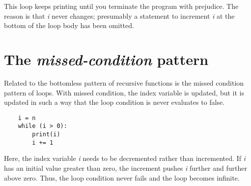 This loop keeps printing until you terminate the program with
prejudice. The reason is that {\it i} never changes; presumably a
statement to increment {\it i} at the bottom of the loop body has
been omitted.

\section{The {\it missed-condition} pattern}

Related to the bottomless pattern of recursive functions
is the missed condition pattern of loops.
With missed condition, the index variable is updated, but
it is updated in such a way that the loop condition is
never evaluates to false.

\begin{verbatim}
    i = n
    while (i > 0):
        print(i)
        i += 1
\end{verbatim}

Here, the index variable {\it i} needs to be decremented rather than
incremented. If {\it i} has an initial value greater than zero,
the increment pushes {\it i} further and further above zero.
Thus, the loop condition never fails and the loop
becomes infinite.
